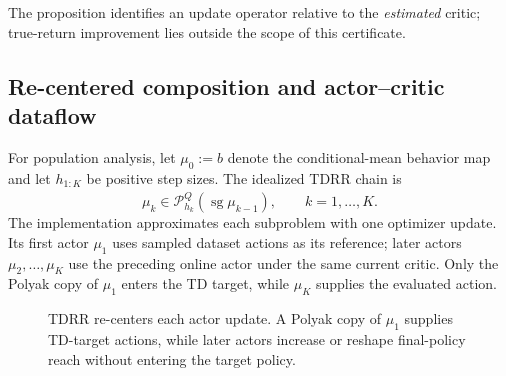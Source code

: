 \documentclass[letterpaper]{article}
\begin{document}
The proposition identifies an update operator relative to the \emph{estimated}
critic; true-return improvement lies outside the scope of this certificate.

\subsection{Re-centered composition and actor--critic dataflow}

For population analysis, let $\mu_0:=b$ denote the conditional-mean behavior
map and let $h_{1:K}$ be positive step sizes. The idealized TDRR chain is
\begin{equation}
 \mu_k\in\mathcal P_{h_k}^{\widehat Q}
 (\operatorname{sg}\mu_{k-1}),
 \qquad k=1,\ldots,K.
 \label{eq:tdrr}
\end{equation}
The implementation approximates each subproblem with one optimizer update.
Its first actor $\mu_1$ uses sampled dataset actions as its reference; later actors $\mu_2,\ldots,\mu_K$ use the preceding online actor
under the same current critic. Only the Polyak copy of $\mu_1$ enters the TD
target, while $\mu_K$ supplies the evaluated action.

\begin{figure}[t]
\centering
{}
\caption{TDRR re-centers each actor update. A Polyak copy of $\mu_1$ supplies
TD-target actions, while later actors increase or reshape final-policy reach
without entering the target policy.}
\label{fig:architecture}
\end{figure}
\end{document}
